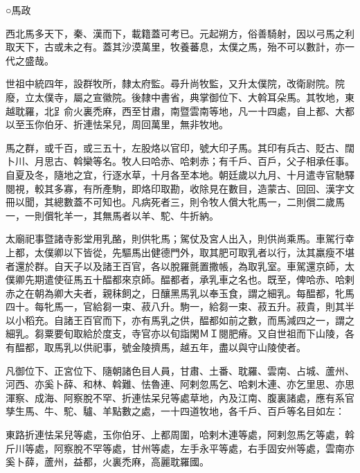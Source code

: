 
\begin{pinyinscope}

 ○馬政



 西北馬多天下，秦、漢而下，載籍蓋可考已。元起朔方，俗善騎射，因以弓馬之利取天下，古或未之有。蓋其沙漠萬里，牧養蕃息，太僕之馬，殆不可以數計，亦一代之盛哉。



 世祖中統四年，設群牧所，隸太府監。尋升尚牧監，又升太僕院，改衛尉院。院廢，立太僕寺，屬之宣徽院。後隸中書省，典掌御位下、大斡耳朵馬。其牧地，東越耽羅，北𧾷俞火裏禿麻，西至甘肅，南暨雲南等地，凡一十四處，自上都、大都以至玉你伯牙、折連怯呆兒，周回萬里，無非牧地。



 馬之群，或千百，或三五十，左股烙以官印，號大印子馬。其印有兵古、貶古、闊卜川、月思古、斡欒等名。牧人曰哈赤、哈剌赤；有千戶、百戶，父子相承任事。自夏及冬，隨地之宜，行逐水草，十月各至本地。朝廷歲以九月、十月遣寺官馳驛閱視，較其多寡，有所產駒，即烙印取勘，收除見在數目，造蒙古、回回、漢字文冊以聞，其總數蓋不可知也。凡病死者三，則令牧人償大牝馬一，二則償二歲馬一，一則償牝羊一，其無馬者以羊、駝、牛折納。



 太廟祀事暨諸寺影堂用乳酪，則供牝馬；駕仗及宮人出入，則供尚乘馬。車駕行幸上都，太僕卿以下皆從，先驅馬出健德門外，取其肥可取乳者以行，汰其羸瘦不堪者還於群。自天子以及諸王百官，各以脫羅氈置撒帳，為取乳室。車駕還京師，太僕卿先期遣使征馬五十醖都來京師。醖都者，承乳車之名也。既至，俾哈赤、哈剌赤之在朝為卿大夫者，親秣飼之，日釀黑馬乳以奉玉食，謂之細乳。每醖都，牝馬四十。每牝馬一，官給芻一束、菽八升。駒一，給芻一束、菽五升。菽貴，則其半以小稻充。自諸王百官而下，亦有馬乳之供，醖都如前之數，而馬減四之一，謂之細乳。芻粟要旬取給於度支，寺官亦以旬詣閑ＭＩ閱肥瘠。又自世祖而下山陵，各有醖都，取馬乳以供祀事，號金陵擠馬，越五年，盡以與守山陵使者。



 凡御位下、正宮位下、隨朝諸色目人員，甘肅、土番、耽羅、雲南、占城、蘆州、河西、亦奚卜薛、和林、斡難、怯魯連、阿剌忽馬乞、哈剌木連、亦乞里思、亦思渾察、成海、阿察脫不罕、折連怯呆兒等處草地，內及江南、腹裏諸處，應有系官孳生馬、牛、駝、驢、羊點數之處，一十四道牧地，各千戶、百戶等名目如左：



 東路折連怯呆兒等處，玉你伯牙、上都周圍，哈剌木連等處，阿剌忽馬乞等處，斡斤川等處，阿察脫不罕等處，甘州等處，左手永平等處，右手固安州等處，雲南亦奚卜薛，蘆州，益都，火裏禿麻，高麗耽羅國。




\end{pinyinscope}
